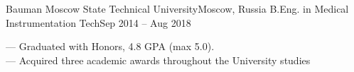 \resumeSubheading
{Bauman Moscow State Technical University}{Moscow, Russia}
{B.Eng. in Medical Instrumentation Tech}{Sep 2014 -- Aug 2018}
\begin{itemize}[leftmargin=0in, label={}]
    \small{\item{
        {— Graduated with Honors, 4.8 GPA (max 5.0).}\\
        {— Acquired three academic awards throughout the University studies}\\
    }}
\end{itemize}
